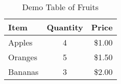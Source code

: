 \begin{table}[ht]
  \centering %
  \begin{tabular}{l|c|r} %
    \hline
    \textbf{Item} & \textbf{Quantity} & \textbf{Price} \\ \hline %
    Apples        & 4                 & \$1.00         \\
    Oranges       & 5                 & \$1.50         \\
    Bananas       & 3                 & \$2.00         \\ \hline
  \end{tabular}
  \caption{Demo Table of Fruits} %
  \label{tab:fruits} %
\end{table}
